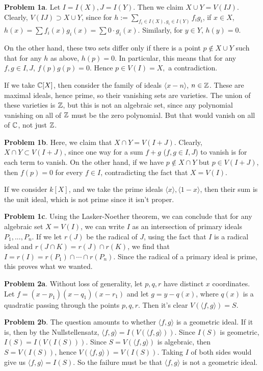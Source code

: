\noindent \textbf{Problem 1a}. Let $I = I(X), J = I(Y)$. Then we claim $X \cup Y = V(IJ)$. Clearly, $V(IJ) \supset X \cup Y$, since for $h := \sum_{f_i \in I(X), g_i \in I(Y)} f_i g_i$, if $x \in X$, $h(x) = \sum f_i(x) g_i(x) = \sum 0 \cdot g_i(x).$ Similarly, for $y \in Y$, $h(y) = 0$.

On the other hand, these two sets differ only if there is a point $p \not\in X \cup Y$ such that for any $h$ as above, $h(p) = 0$. In particular, this means that for any $f, g \in I, J$, $f(p) g(p) = 0$. Hence $p \in V(I) = X,$ a contradiction.

If we take $\mathbb{C}[X]$, then consider the family of ideals $\langle x - n \rangle$, $n \in \mathbb{Z}$. These are maximal ideals, hence prime, so their vanishing sets are varieties. The union of these varieties is $\mathbb{Z}$, but this is not an algebraic set, since any polynomial vanishing on all of $\mathbb{Z}$ must be the zero polynomial. But that would vanish on all of $\mathbb{C}$, not just $\mathbb{Z}$.

\noindent \textbf{Problem 1b}. Here, we claim that $X \cap Y = V(I + J)$. Clearly, $X \cap Y \subset V(I + J)$, since one way for a sum $f + g$ ($f, g \in I, J$) to vanish is for each term to vanish. On the other hand, if we have $p \not\in X \cap Y$ but $p \in V(I + J)$, then $f(p) = 0$ for every $f \in I$, contradicting the fact that $X = V(I).$  

If we consider $k[X]$, and we take the prime ideals $\langle x \rangle, \langle 1 - x \rangle$, then their sum is the unit ideal, which is not prime since it isn't proper. 

\noindent\textbf{Problem 1c}. Using the Lasker-Noether theorem, we can conclude that for any algebraic set $X = V(I)$, we can write $I$ as an intersection of primary ideals $P_1, ..., P_n$. If we let $r(J)$ be the radical of $J$, using the fact that $I$ is a radical ideal and $r(J \cap K) = r(J) \cap r(K)$, we find that $I = r(I) = r(P_1) \cap \cdots \cap r(P_n)$. Since the radical of a primary ideal is prime, this proves what we wanted.

\noindent\textbf{Problem 2a}. Without loss of generality, let $p, q, r$ have distinct $x$ coordinates. Let $f = (x - p_1) (x - q_1) (x - r_1)$ and let $g = y - q(x)$, where $q(x)$ is a quadratic passing through the points $p, q, r$. Then it's clear $V(\langle f, g \rangle) = S.$

\noindent\textbf{Problem 2b}. The question amounts to whether $\langle f, g \rangle$ is a geometric ideal. If it is, then by the Nullstellensatz, $\langle f, g \rangle = I(V(\langle f, g \rangle))$. Since $I(S)$ is geometric, $I(S) = I(V(I(S)))$. Since $S = V(\langle f, g \rangle)$ is algebraic, then $S = V(I(S))$, hence $V(\langle f, g \rangle) = V(I(S))$. Taking $I$ of both sides would give us $\langle f, g \rangle = I(S).$ So the failure must be that $\langle f, g \rangle$ is not a geometric ideal.

